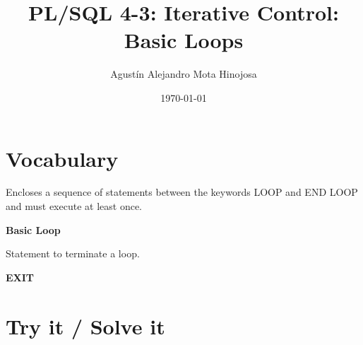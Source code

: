 \documentclass[11pt]{article}
\author{Agustín Alejandro Mota Hinojosa}
\date{\today}
\title{PL/SQL 4-3: Iterative Control: Basic Loops}
\begin{document}
\maketitle
\tableofcontents

\section{Vocabulary}
\label{sec:org46d57c8}

Encloses a sequence of statements between the keywords LOOP and END LOOP and must execute at least once.

\textbf{Basic Loop}

Statement to terminate a loop.

\textbf{EXIT}
\section{Try it / Solve it}
\label{sec:orge175479}
\end{document}
